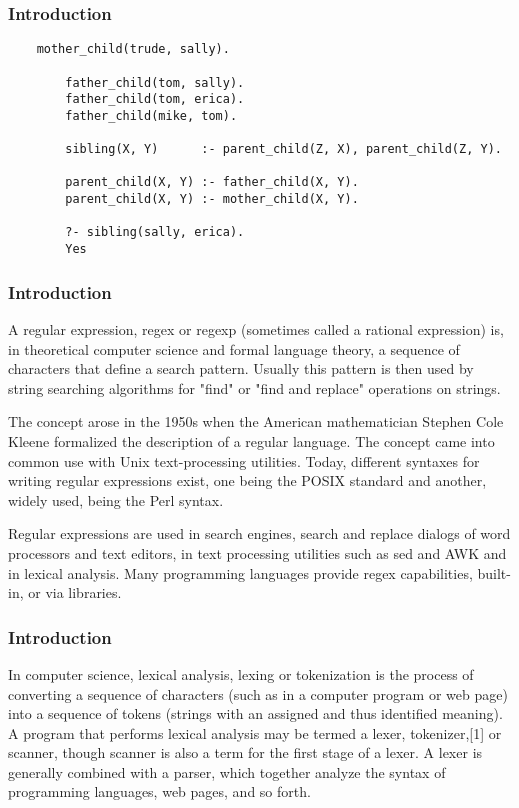 \documentclass{beamer}
\begin{document}
\begin{frame}[fragile]
    \frametitle{Introduction}
    \begin{minipage}{\textwidth}
\begin{lstlisting}
    mother_child(trude, sally).
        
        father_child(tom, sally).
        father_child(tom, erica).
        father_child(mike, tom).
        
        sibling(X, Y)      :- parent_child(Z, X), parent_child(Z, Y).
        
        parent_child(X, Y) :- father_child(X, Y).
        parent_child(X, Y) :- mother_child(X, Y).

        ?- sibling(sally, erica).
        Yes    
\end{lstlisting}
    \end{minipage}
\end{frame}

\begin{frame}
    \frametitle{Introduction}
    \begin{minipage}{\textwidth}
        A regular expression, regex or regexp (sometimes called a rational expression) is, in theoretical computer science and formal language theory, a sequence of characters that define a search pattern. Usually this pattern is then used by string searching algorithms for "find" or "find and replace" operations on strings.

        The concept arose in the 1950s when the American mathematician Stephen Cole Kleene formalized the description of a regular language. The concept came into common use with Unix text-processing utilities. Today, different syntaxes for writing regular expressions exist, one being the POSIX standard and another, widely used, being the Perl syntax.

        Regular expressions are used in search engines, search and replace dialogs of word processors and text editors, in text processing utilities such as sed and AWK and in lexical analysis. Many programming languages provide regex capabilities, built-in, or via libraries.
    \end{minipage}
\end{frame}
        
\begin{frame}
    \frametitle{Introduction}
    \begin{minipage}{\textwidth}
        In computer science, lexical analysis, lexing or tokenization is the process of converting a sequence of characters (such as in a computer program or web page) into a sequence of tokens (strings with an assigned and thus identified meaning). A program that performs lexical analysis may be termed a lexer, tokenizer,[1] or scanner, though scanner is also a term for the first stage of a lexer. A lexer is generally combined with a parser, which together analyze the syntax of programming languages, web pages, and so forth.        
\end{minipage}
\end{frame}
\end{document}
